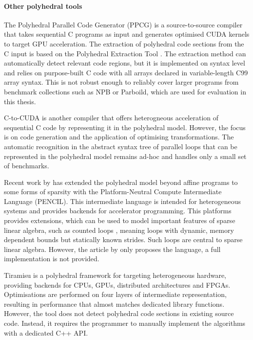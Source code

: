     \paragraph*{Other polyhedral tools}
    The Polyhedral Parallel Code Generator (PPCG)
    \citep{Verdoolaege:2013:PPC:2400682.2400713} is a source-to-source compiler
    that takes sequential C programs as input and generates optimised CUDA
    kernels to target GPU acceleration.
    The extraction of polyhedral code sections from the C input is based on the
    Polyhedral Extraction Tool \citep{Verdoolaege12polyhedralextraction}.
    The extraction method can automatically detect relevant code regions, but it
    is implemented on syntax level and relies on purpose-built C code with all
    arrays declared in variable-length C99 array syntax.
    This is not robust enough to reliably cover larger programs from benchmark
    collections such as NPB or Parboild, which are used for evaluation in this
    thesis.

    C-to-CUDA \citep{Baskaran:2010:ACC:2175462.2175482} is another compiler that
    offers heterogneous acceleration of sequential C code by representing it in
    the polyhedral model.
    However, the focus is on code generation and the application of optimising
    transformations.
    The automatic recognition in the abstract syntax tree of parallel loops that
    can be represented in the polyhedral model remains ad-hoc and handles only a
    small set of benchmarks.

    Recent work by \citet{baghdadi2015PENCIL} has extended the polyhedral model
    beyond affine programs to some forms of sparsity with the
    Platform-Neutral Compute Intermediate Language (PENCIL).
    This intermediate language is intended for heterogeneous systems and
    provides backends for accelerator programming.
    This platforms provides extensions, which can be used to model important
    features of sparse linear algebra, such as counted loops
    \citep{Zhao:2018:PCF:3178372.3179509}, meaning loops with dynamic, memory
    dependent bounds but statically known strides.
    Such loops are central to sparse linear algebra.
    However, the article by \citet{baghdadi2015PENCIL} only proposes the
    language, a full implementation is not provided.

    Tiramisu \citep{Baghdadi:2019:TPC:3314872.3314896} is a polyhedral framework
    for targeting heterogeneous hardware, providing backends for CPUs, GPUs,
    distributed architectures and FPGAs.
    Optimisations are performed on four layers of intermediate representation,
    resulting in performance that almost matches dedicated library functions.
    However, the tool does not detect polyhedral code sections in existing
    source code.
    Instead, it requires the programmer to manually implement the algorithms
    with a dedicated C++ API.


